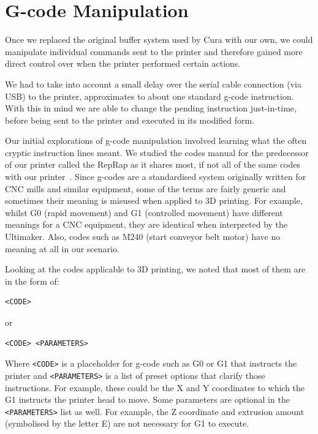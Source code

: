 \documentclass[pdftex, 11pt]{report} %
\begin{document}
\section{G-code Manipulation}
\label{section:GCodeManipulation}
Once we replaced the original buffer system used by Cura with our own, we could manipulate individual commands sent to the printer and therefore gained more direct control over when the printer performed certain actions.

We had to take into account a small delay over the serial cable connection (via USB) to the printer, approximates to about one standard g-code instruction. With this in mind we are able to change the pending instruction just-in-time, before being sent to the printer and executed in its modified form.

Our initial explorations of g-code manipulation involved learning what the often cryptic instruction lines meant. We studied the codes manual for the predecessor of our printer called the RepRap as it shares most, if not all of the same codes with our printer~\cite{RepRap2007}. Since g-codes are a standardised system originally written for CNC mills and similar equipment, some of the terms are fairly generic and sometimes their meaning is misused when applied to 3D printing. For example, whilst G0 (rapid movement) and G1 (controlled movement) have different meanings for a CNC equipment, they are identical when interpreted by the Ultimaker. Also, codes such as M240 (start conveyor belt motor) have no meaning at all in our scenario.

Looking at the codes applicable to 3D printing, we noted that most of them are in the form of:
\begin{verbatim}
<CODE>
\end{verbatim}
or
\begin{verbatim}
<CODE> <PARAMETERS>
\end{verbatim}

Where \verb|<CODE>| is a placeholder for g-code such as G0 or G1 that instructs the printer and \verb|<PARAMETERS>| is a list of preset options that clarify those instructions. For example, these could be the X and Y coordinates to which the G1 instructs the printer head to move. Some parameters are optional in the \verb|<PARAMETERS>| list as well. For example, the Z coordinate and extrusion amount (symbolised by the letter E) are not necessary for G1 to execute.
\end{document}
